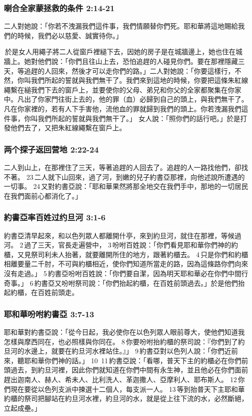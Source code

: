 \subsubsection{喇合全家蒙拯救的条件 2:14-21}
二人對她說：「你若不洩漏我們這件事，我們情願替你們死。耶和華將這地賜給我們的時候，我們必以慈愛、誠實待你。」

 於是女人用繩子將二人從窗戶裡縋下去，因她的房子是在城牆邊上，她也住在城牆上。她對他們說：「你們且往山上去，恐怕追趕的人碰見你們。要在那裡隱藏三天，等追趕的人回來，然後才可以走你們的路。」二人對她說：「你要這樣行，不然，你叫我們所起的誓就與我們無干了。我們來到這地的時候，你要把這條朱紅線繩繫在縋我們下去的窗戶上，並要使你的父母、弟兄和你父的全家都聚集在你家中。凡出了你家門往街上去的，他的罪（血）必歸到自己的頭上，與我們無干了。凡在你家裡的，若有人下手害他，流他血的罪就歸到我們的頭上。你若洩漏我們這件事，你叫我們所起的誓就與我們無干了。」 女人說：「照你們的話行吧。」於是打發他們去了，又把朱紅線繩繫在窗戶上。


\subsubsection{两个探子返回营地 2:22-24}
二人到山上，在那裡住了三天，等著追趕的人回去了。追趕的人一路找他們，卻找不著。 23 二人就下山回來，過了河，到嫩的兒子約書亞那裡，向他述說所遭遇的一切事。 24 又對約書亞說：「耶和華果然將那全地交在我們手中，那地的一切居民在我們面前心都消化了。」

\subsubsection{約書亞率百姓过约旦河 3:1-6}
約書亞清早起來，和以色列眾人都離開什亭，來到約旦河，就住在那裡，等候過河。 2 過了三天，官長走遍營中， 3 吩咐百姓說：「你們看見耶和華你們神的約櫃，又見祭司利未人抬著，就要離開所住的地方，跟著約櫃去。 4 只是你們和約櫃相離要量二千肘，不可與約櫃相近，使你們知道所當走的路，因為這條路你們向來沒有走過。」 5 約書亞吩咐百姓說：「你們要自潔，因為明天耶和華必在你們中間行奇事。」 6 約書亞又吩咐祭司說：「你們抬起約櫃，在百姓前頭過去。」於是他們抬起約櫃，在百姓前頭走。

\subsubsection{耶和華吩咐約書亞 3:7-13}
耶和華對約書亞說：「從今日起，我必使你在以色列眾人眼前尊大，使他們知道我怎樣與摩西同在，也必照樣與你同在。 8 你要吩咐抬約櫃的祭司說：『你們到了約旦河的水邊上，就要在約旦河水裡站住。』」 9 約書亞對以色列人說：「你們近前來，聽耶和華你們神的話。」 10  11 約書亞說：「看哪，普天下主的約櫃必在你們前頭過去，到約旦河裡，因此你們就知道在你們中間有永生神，並且他必在你們面前趕出迦南人、赫人、希未人、比利洗人、革迦撒人、亞摩利人、耶布斯人。 12 你們現在要從以色列支派中揀選十二個人，每支派一人。 13 等到抬普天下主耶和華約櫃的祭司把腳站在約旦河水裡，約旦河的水，就是從上往下流的水，必然斷絕，立起成壘。」


